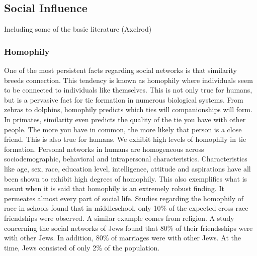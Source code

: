 \documentclass[9pt,twocolumn,twoside]{ilcss}
\begin{document}
\subsection{Social Influence}

Including some of the basic literature (Axelrod)

\subsubsection{Homophily}
One of the most persistent facts regarding social networks is that similarity breeds connection. 
This tendency is known as homophily where individuals seem to be connected to individuals like themselves. 
This is not only true for humans, but is a pervasive fact for tie formation in numerous biological systems. 
From zebras to dolphins, homophily predicts which ties will companionships will form. 
In primates, similarity even predicts the quality of the tie you have with other people. The more you have in common, the more likely that person is a close friend.
This is also true for humans. We exhibit high levels of homophily in tie formation. 
Personal networks in humans are homogeneous across sociodemographic, behavioral and intrapersonal characteristics. 
Characteristics like age, sex, race, education level, intelligence, attitude and aspirations have all been shown to exhibit high degrees of homophily. 
This also exemplifies what is meant when it is said that homophily is an extremely robust finding. It permeates almost every part of social life.
Studies regarding the homophily of race in schools found that in middleschool, only 10\% of the expected cross race friendships were observed. 
A similar example comes from religion. A study concerning the social networks of Jews found that 80\% of their friendsships were with other Jews. 
In addition, 80\% of marriages were with other Jews. At the time, Jews consisted of only 2\% of the population.
\end{document}
